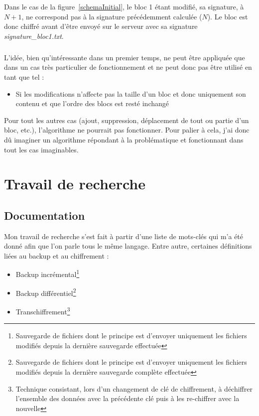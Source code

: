 \documentclass[a4paper,10pt, twoside]{report}
\begin{document}
\begin{spacing}{1.2}
Dans le cas de la figure~\ref{schemaInitial}, le bloc 1 \'etant modifi\'e, sa
signature, \`a \(N + 1\), ne correspond pas \`a la signature pr\'ec\'edemment
calcul\'ee (\(N\)). Le bloc est donc chiffr\'e avant d'\^etre envoy\'e sur le
serveur avec sa signature \textit{signature\_bloc1.txt}.

\subparagraph{}
L'id\'ee, bien qu'int\'eressante dans un premier temps, ne peut \^etre
appliqu\'ee que dans un cas tr\`es particulier de fonctionnement et ne peut
donc pas \^etre utilis\'e en tant que tel :
\begin{itemize}
 \item Si les modifications n'affecte pas la taille d'un bloc et donc
 uniquement son contenu et que l'ordre des blocs est rest\'e inchang\'e
\end{itemize}

Pour tout les autres cas (ajout, suppression, d\'eplacement de tout ou partie
d'un bloc, etc.), l'algorithme ne pourrait pas fonctionner. Pour palier \`a
cela, j'ai donc d\^u imaginer un algorithme r\'epondant \`a la probl\'ematique
et fonctionnant dans tout les cas imaginables.

\section{Travail de recherche}
\label{secTravailRecherche}
\subsection{Documentation}
Mon travail de recherche s'est fait \`a partir d'une liste de mots-cl\'es qui
m'a \'et\'e donn\'e afin que l'on parle tous le m\^eme langage. Entre autre,
certaines d\'efinitions li\'ees au backup et au chiffrement :
\begin{itemize}
 \item Backup incr\'emental\footnote{Sauvegarde de fichiers dont le principe est
 d'envoyer uniquement les fichiers modifi\'es depuis la derni\`ere sauvegarde
 effectu\'ee}
 \item Backup diff\'erentiel\footnote{Sauvegarde de fichiers dont le principe
 est d'envoyer uniquement les fichiers modifi\'es depuis la derni\`ere
 sauvegarde compl\`ete effectu\'ee}
 \item Transchiffrement\footnote{Technique consistant, lors d'un changement
 de cl\'e de chiffrement, \`a d\'echiffrer l'ensemble des donn\'ees avec la
 pr\'ec\'edente cl\'e puis \`a les re-chiffrer avec la nouvelle}
\end{itemize}


\end{spacing}
\end{document}
